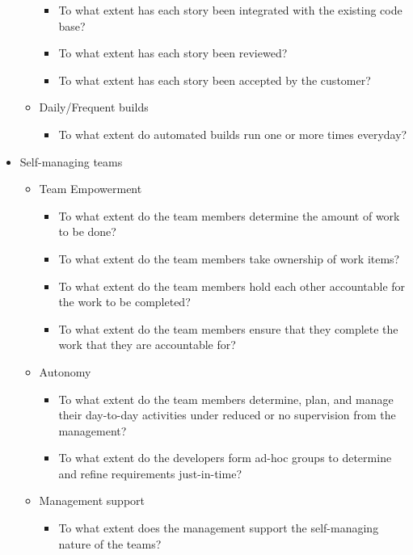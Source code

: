 \begin{appendices}
\begin{itemize}
\begin{itemize}
\begin{itemize}
					\item To what extent has each story been integrated with the existing code base? 
					\item To what extent has each story been reviewed? 
					\item To what extent has each story been accepted by the customer? 
				\end{itemize}
			\item Daily/Frequent builds
				\begin{itemize}
					\item To what extent do automated builds run one or more times everyday?
				\end{itemize}
		\end{itemize}

	\item Self-managing teams
		\begin{itemize}
			\item Team Empowerment
				\begin{itemize}
					\item To what extent do the team members determine the amount of work to be done? 
					\item To what extent do the team members take ownership of work items? 
					\item To what extent do the team members hold each other accountable for the work to be completed? 
					\item To what extent do the team members ensure that they complete the work that they are accountable for?
				\end{itemize}
			\item Autonomy
				\begin{itemize}
					\item To what extent do the team members determine, plan, and manage their day-to-day activities under reduced or no supervision from the management? 
					\item To what extent do the developers form ad-hoc groups to determine and refine requirements just-in-time? 
				\end{itemize}
			\item Management support
				\begin{itemize}
					\item To what extent does the management support the self-managing nature of the teams?
				\end{itemize}
		\end{itemize}

\end{itemize}
\end{appendices}
